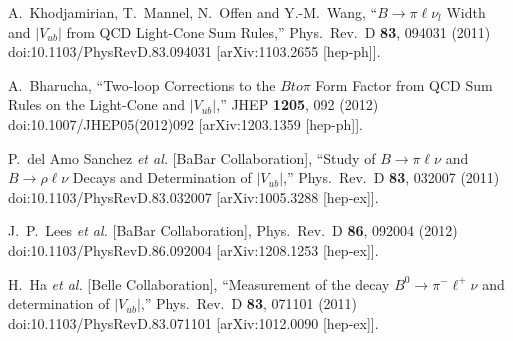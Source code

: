 \documentclass[aps,preprint,floats,epsf,epsfig,nofootinbib,letter]{revtex4}
\begin{document}
\begin{thebibliography}{99}
  A.~Khodjamirian, T.~Mannel, N.~Offen and Y.-M.~Wang,
  ``$B \to \pi \ell \nu_l$ Width and $|V_{ub}|$ from QCD Light-Cone Sum Rules,''
  Phys.\ Rev.\ D {\bf 83}, 094031 (2011)
  doi:10.1103/PhysRevD.83.094031
  [arXiv:1103.2655 [hep-ph]].

  A.~Bharucha,
  ``Two-loop Corrections to the $B to \pi$ Form Factor from QCD Sum Rules on the Light-Cone and $|V_{ub}|$,''
  JHEP {\bf 1205}, 092 (2012)
  doi:10.1007/JHEP05(2012)092
  [arXiv:1203.1359 [hep-ph]].

  P.~del Amo Sanchez {\it et al.} [BaBar Collaboration],
  ``Study of $B \to \pi \ell \nu$ and $B \to \rho \ell \nu$ Decays and Determination of $|V_{ub}|$,''
  Phys.\ Rev.\ D {\bf 83}, 032007 (2011)
  doi:10.1103/PhysRevD.83.032007
  [arXiv:1005.3288 [hep-ex]].
  

  J.~P.~Lees {\it et al.} [BaBar Collaboration],
  Phys.\ Rev.\ D {\bf 86}, 092004 (2012)
  doi:10.1103/PhysRevD.86.092004
  [arXiv:1208.1253 [hep-ex]].

  H.~Ha {\it et al.} [Belle Collaboration],
  ``Measurement of the decay $B^0\to\pi^-\ell^+\nu$ and determination of $|V_{ub}|$,''
  Phys.\ Rev.\ D {\bf 83}, 071101 (2011)
  doi:10.1103/PhysRevD.83.071101
  [arXiv:1012.0090 [hep-ex]].
  

\end{thebibliography}
\end{document}
